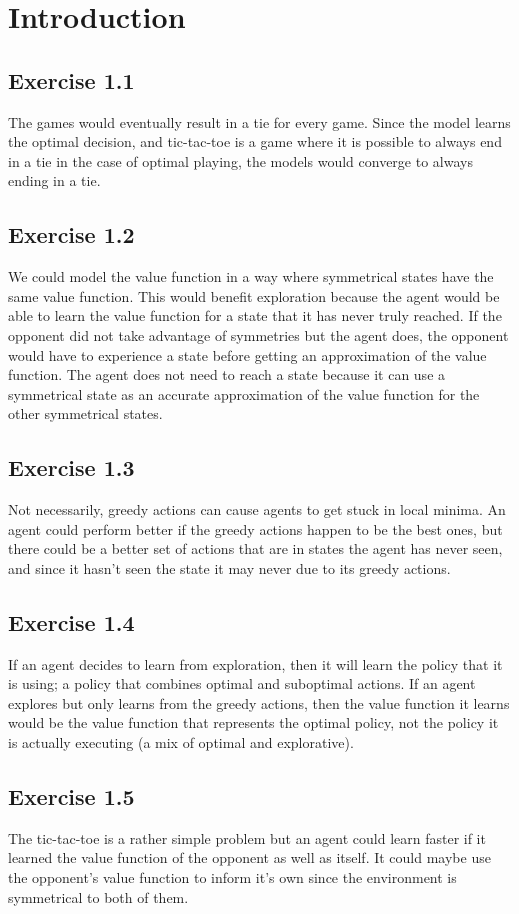 \section{Introduction}


\subsection{Exercise 1.1}
The games would eventually result in a tie for every game. Since the model learns the optimal decision, and tic-tac-toe is a game where it is possible to always end in a tie in the case of optimal playing, the models would converge to always ending in a tie.

\subsection{Exercise 1.2}
We could model the value function in a way where symmetrical states have the same value function. This would benefit exploration because the agent would be able to learn the value function for a state that it has never truly reached. If the opponent did not take advantage of symmetries but the agent does, the opponent would have to experience a state before getting an approximation of the value function. The agent does not need to reach a state because it can use a symmetrical state as an accurate approximation of the value function for the other symmetrical states.

\subsection{Exercise 1.3}
Not necessarily, greedy actions can cause agents to get stuck in local minima. An agent could perform better if the greedy actions happen to be the best ones, but there could be a better set of actions that are in states the agent has never seen, and since it hasn't seen the state it may never due to its greedy actions.

\subsection{Exercise 1.4}
If an agent decides to learn from exploration, then it will learn the policy that it is using; a policy that combines optimal and suboptimal actions. If an agent explores but only learns from the greedy actions, then the value function it learns would be the value function that represents the optimal policy, not the policy it is actually executing (a mix of optimal and explorative).

\subsection{Exercise 1.5}
The tic-tac-toe is a rather simple problem but an agent could learn faster if it learned the value function of the opponent as well as itself. It could maybe use the opponent's value function to inform it's own since the environment is symmetrical to both of them.